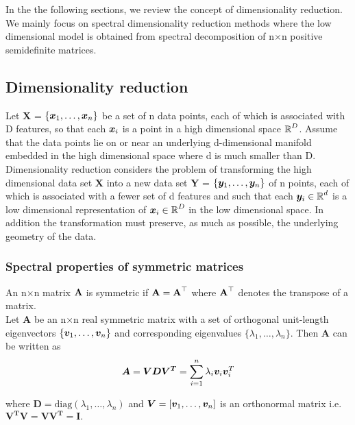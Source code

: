 


In the the following sections, we review the concept of dimensionality reduction.
We mainly focus on spectral dimensionality reduction methods where the 
low dimensional model is obtained from spectral decomposition of n$\times$n
positive semidefinite matrices.

\subsection{Dimensionality reduction}
Let \textbf{X} = $\displaystyle \{\boldsymbol{x}_{1}, \ldots , \boldsymbol{x}_{n} \}$
be a set of n data points, each of which is associated with D features, so that each $\boldsymbol{x}_{i}$ is a point in a high dimensional space $\operatorname{\mathbb{R}}^{D}$. Assume that the data points lie on or near an underlying d-dimensional manifold embedded in the high dimensional space where d is much smaller than D. Dimensionality reduction considers the problem of  transforming the high dimensional data set
$\textbf{X}$ into a new data set \textbf{Y} = $\displaystyle \{ \boldsymbol{y}_{1}, \ldots, \boldsymbol{y}_{n} \}$  of n points, each of which is associated
with a fewer set of d features and such that each $\boldsymbol{y}_{i} \in \operatorname{\mathbb{R}}^{d}$ is a low dimensional representation of $\boldsymbol{x}_{i} \in \operatorname{\mathbb{R}}^{D}$ in the low dimensional space. In addition the transformation must preserve, as much as possible, the underlying geometry of the data.



\subsubsection{Spectral properties of symmetric matrices}
An n$\times$n matrix $\textbf{A}$ is symmetric if $\textbf{A} = \textbf{A}^{\top}$
where $\textbf{A}^{\top}$ denotes the transpose of a matrix.\\
Let \textbf{A} be an n$\times$n real symmetric matrix with a set of 
orthogonal unit-length eigenvectors  $\{ \boldsymbol{v}_{1}, \ldots, \boldsymbol{v}_{n} \}$ and corresponding eigenvalues $\{\lambda_{1}, \ldots, \lambda_{n} \}.$ 
Then \textbf{A} can be written as 
\[ 
\bm{A} = \bm{VDV^{T}} = 
\sum_{i=1}^{n} \lambda_{i} \boldsymbol{v}_{i} \boldsymbol{v}_{i}^{T} 
\]

where $\bm{D} = \text{diag}(\lambda_{1}, \ldots, \lambda_{n})$ and  $ \bm{V} = [\boldsymbol{v}_{1}, \ldots, \boldsymbol{v}_{n}]$ is an orthonormal matrix i.e.
$\bm{V^{T}V  = VV^{T} = I}.$\\


